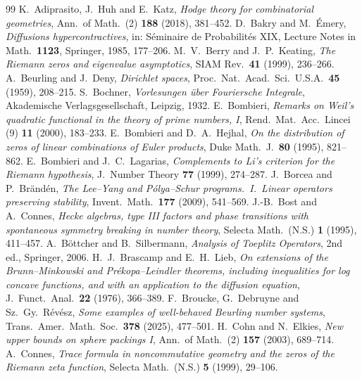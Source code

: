 \documentclass[11pt]{amsart}
\theoremstyle{definition}
\theoremstyle{remark}
\numberwithin{equation}{section}
\begin{document}
\begin{thebibliography}{99}
 K.~Adiprasito, J.~Huh and E.~Katz, \emph{Hodge theory for combinatorial geometries}, Ann.\ of Math.\ (2) \textbf{188} (2018), 381--452.
 D.~Bakry and M.~\'Emery, \emph{Diffusions hypercontractives}, in: S\'eminaire de Probabilit\'es XIX, Lecture Notes in Math.\ \textbf{1123}, Springer, 1985, 177--206.
 M.~V.~Berry and J.~P.~Keating, \emph{The Riemann zeros and eigenvalue asymptotics}, SIAM Rev.\ \textbf{41} (1999), 236--266.
 A.~Beurling and J.~Deny, \emph{Dirichlet spaces}, Proc.\ Nat.\ Acad.\ Sci.\ U.S.A.\ \textbf{45} (1959), 208--215.
 S.~Bochner, \emph{Vorlesungen \"uber Fouriersche Integrale}, Akademische Verlagsgesellschaft, Leipzig, 1932.
 E.~Bombieri, \emph{Remarks on Weil's quadratic functional in the theory of prime numbers, I}, Rend.\ Mat.\ Acc.\ Lincei (9) \textbf{11} (2000), 183--233.
 E.~Bombieri and D.~A.~Hejhal, \emph{On the distribution of zeros of linear combinations of Euler products}, Duke Math.\ J.\ \textbf{80} (1995), 821--862.
 E.~Bombieri and J.~C.~Lagarias, \emph{Complements to Li's criterion for the Riemann hypothesis}, J.\ Number Theory \textbf{77} (1999), 274--287.
 J.~Borcea and P.~Br\"and\'en, \emph{The Lee--Yang and P\'olya--Schur programs.\ I.\ Linear operators preserving stability}, Invent.\ Math.\ \textbf{177} (2009), 541--569.
 J.-B.~Bost and A.~Connes, \emph{Hecke algebras, type III factors and phase transitions with spontaneous symmetry breaking in number theory}, Selecta Math.\ (N.S.) \textbf{1} (1995), 411--457.
 A.~B\"ottcher and B.~Silbermann, \emph{Analysis of Toeplitz Operators}, 2nd ed., Springer, 2006.
 H.~J.~Brascamp and E.~H.~Lieb, \emph{On extensions of the Brunn--Minkowski and Pr\'ekopa--Leindler theorems, including inequalities for log concave functions, and with an application to the diffusion equation}, J.\ Funct.\ Anal.\ \textbf{22} (1976), 366--389.
 F.~Broucke, G.~Debruyne and Sz.~Gy.~R\'ev\'esz, \emph{Some examples of well-behaved Beurling number systems}, Trans.\ Amer.\ Math.\ Soc.\ \textbf{378} (2025), 477--501.
 H.~Cohn and N.~Elkies, \emph{New upper bounds on sphere packings I}, Ann.\ of Math.\ (2) \textbf{157} (2003), 689--714.
 A.~Connes, \emph{Trace formula in noncommutative geometry and the zeros of the Riemann zeta function}, Selecta Math.\ (N.S.) \textbf{5} (1999), 29--106.

\end{thebibliography}
\end{document}
